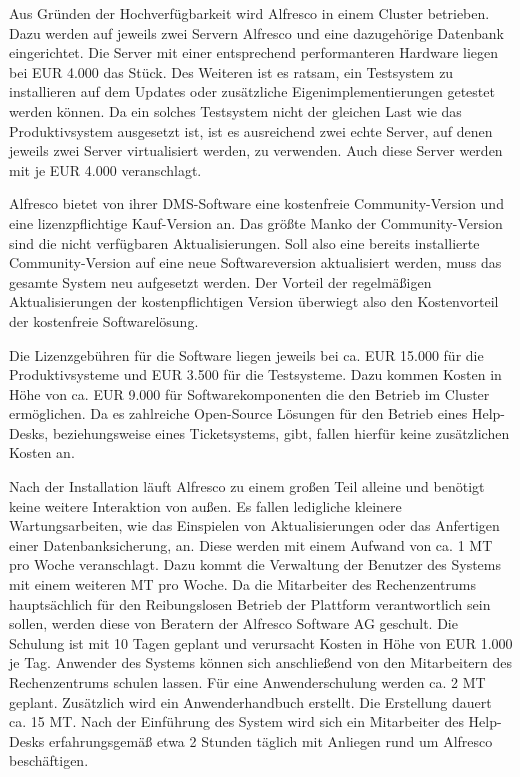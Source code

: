 Aus Gründen der Hochverfügbarkeit wird Alfresco in einem Cluster betrieben. Dazu werden auf 
jeweils zwei Servern Alfresco und eine dazugehörige Datenbank eingerichtet. Die Server mit 
einer entsprechend performanteren Hardware liegen bei EUR 4.000 das Stück. Des Weiteren ist 
es ratsam, ein Testsystem zu installieren auf dem Updates oder zusätzliche 
Eigenimplementierungen getestet werden können. Da ein solches Testsystem nicht der gleichen 
Last wie das Produktivsystem ausgesetzt ist, ist es ausreichend zwei echte Server, auf denen jeweils 
zwei Server virtualisiert werden, zu verwenden. Auch diese Server werden mit je EUR 4.000 
veranschlagt.

Alfresco bietet von ihrer DMS-Software eine kostenfreie Community-Version und eine lizenzpflichtige Kauf-Version an. Das größte Manko der Community-Version sind die nicht verfügbaren Aktualisierungen. Soll also eine bereits installierte Community-Version auf eine neue Softwareversion aktualisiert werden, muss das gesamte System neu aufgesetzt werden. Der Vorteil der regelmäßigen Aktualisierungen der kostenpflichtigen Version überwiegt also den Kostenvorteil der kostenfreie Softwarelösung.

Die Lizenzgebühren für die Software liegen jeweils bei ca. EUR 15.000 für die Produktivsysteme und EUR 3.500 für die Testsysteme. Dazu kommen Kosten in Höhe von ca. EUR 9.000 für Softwarekomponenten die den Betrieb im Cluster ermöglichen. Da es zahlreiche Open-Source Lösungen für den Betrieb eines Help-Desks, beziehungsweise eines Ticketsystems, gibt, fallen hierfür keine zusätzlichen Kosten an.

Nach der Installation läuft Alfresco zu einem großen Teil alleine und benötigt keine weitere Interaktion von außen. Es fallen ledigliche kleinere Wartungsarbeiten, wie das Einspielen von Aktualisierungen oder das Anfertigen einer Datenbanksicherung, an. Diese werden mit einem Aufwand von ca. 1 MT pro Woche veranschlagt. Dazu kommt die Verwaltung der Benutzer des Systems mit einem weiteren MT pro Woche. Da die Mitarbeiter des Rechenzentrums hauptsächlich für den Reibungslosen Betrieb der Plattform verantwortlich sein sollen, werden diese von Beratern der Alfresco Software AG geschult. Die Schulung ist mit 10 Tagen geplant und verursacht Kosten in Höhe von EUR 1.000 je Tag. Anwender des Systems können sich anschließend von den Mitarbeitern des Rechenzentrums schulen lassen. Für eine Anwenderschulung werden ca. 2 MT geplant. Zusätzlich wird ein Anwenderhandbuch erstellt. Die Erstellung dauert ca. 15 MT. Nach der Einführung des System wird sich ein Mitarbeiter des Help-Desks erfahrungsgemäß etwa 2 Stunden täglich mit Anliegen rund um Alfresco beschäftigen.

